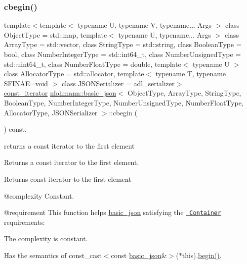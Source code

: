 \subsubsection{\texorpdfstring{cbegin()}{cbegin()}}
{\footnotesize\ttfamily template$<$template$<$ typename U, typename V, typename... Args $>$ class Object\+Type = std\+::map, template$<$ typename U, typename... Args $>$ class Array\+Type = std\+::vector, class String\+Type  = std\+::string, class Boolean\+Type  = bool, class Number\+Integer\+Type  = std\+::int64\+\_\+t, class Number\+Unsigned\+Type  = std\+::uint64\+\_\+t, class Number\+Float\+Type  = double, template$<$ typename U $>$ class Allocator\+Type = std\+::allocator, template$<$ typename T, typename S\+F\+I\+N\+A\+E=void $>$ class J\+S\+O\+N\+Serializer = adl\+\_\+serializer$>$ \\
\mbox{\hyperlink{classnlohmann_1_1basic__json_a41a70cf9993951836d129bb1c2b3126a}{const\+\_\+iterator}} \mbox{\hyperlink{classnlohmann_1_1basic__json}{nlohmann\+::basic\+\_\+json}}$<$ Object\+Type, Array\+Type, String\+Type, Boolean\+Type, Number\+Integer\+Type, Number\+Unsigned\+Type, Number\+Float\+Type, Allocator\+Type, J\+S\+O\+N\+Serializer $>$\+::cbegin (\begin{DoxyParamCaption}{ }\end{DoxyParamCaption}) const\hspace{0.3cm}{\ttfamily [inline]}, {\ttfamily [noexcept]}}



returns a const iterator to the first element 

Returns a const iterator to the first element.

 \begin{DoxyReturn}{Returns}
const iterator to the first element
\end{DoxyReturn}
@complexity Constant.

@requirement This function helps {\ttfamily \mbox{\hyperlink{classnlohmann_1_1basic__json}{basic\+\_\+json}}} satisfying the \href{http://en.cppreference.com/w/cpp/concept/Container}{\texttt{ Container}} requirements\+:
\begin{DoxyItemize}
\item The complexity is constant.
\item Has the semantics of {\ttfamily const\+\_\+cast$<$const \mbox{\hyperlink{classnlohmann_1_1basic__json}{basic\+\_\+json}}\&$>$($\ast$this).\mbox{\hyperlink{classnlohmann_1_1basic__json_a0ff28dac23f2bdecee9564d07f51dcdc}{begin()}}}.
\end{DoxyItemize}

